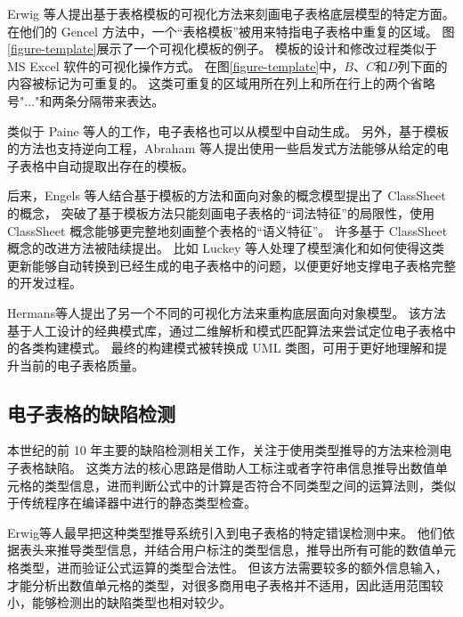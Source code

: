 
Erwig 等人\cite{erwig2004gencel,erwig2005automatic,abraham2005goal}提出基于表格模板的可视化方法来刻画电子表格底层模型的特定方面。
在他们的 Gencel 方法中，一个“表格模板”被用来特指电子表格中重复的区域。
图\ref{figure-template}展示了一个可视化模板的例子。
模板的设计和修改过程类似于 MS Excel 软件的可视化操作方式。
在图\ref{figure-template}中，$B$、$C$和$D$列下面的内容被标记为可重复的。
这类可重复的区域用所在列上和所在行上的两个省略号"..."和两条分隔带来表达。

类似于 Paine 等人的工作，电子表格也可以从模型中自动生成。
另外，基于模板的方法也支持逆向工程，Abraham 等人\cite{abraham2006inferring}提出使用一些启发式方法能够从给定的电子表格中自动提取出存在的模板。

后来，Engels 等人\cite{engels2005classsheets,cunha2010automatically}结合基于模板的方法和面向对象的概念模型提出了 ClassSheet 的概念，
突破了基于模板方法只能刻画电子表格的“词法特征”的局限性，使用 ClassSheet 概念能够更完整地刻画整个表格的“语义特征”。
许多基于 ClassSheet 概念的改进方法被陆续提出\cite{luckey2012systematic,cunha2011type,cunha2011embedding,cunha2012bidirectional}。
比如 Luckey 等人\cite{luckey2012systematic}处理了模型演化和如何使得这类更新能够自动转换到已经生成的电子表格中的问题，以便更好地支撑电子表格完整的开发过程。

Hermans等人\cite{hermans2010automatically}提出了另一个不同的可视化方法来重构底层面向对象模型。
该方法基于人工设计的经典模式库，通过二维解析和模式匹配算法来尝试定位电子表格中的各类构建模式。
最终的构建模式被转换成 UML 类图，可用于更好地理解和提升当前的电子表格质量。

\subsection{电子表格的缺陷检测}
本世纪的前 10 年主要的缺陷检测相关工作，关注于使用类型推导的方法\cite{erwig2002adding,burnett2002testing,ahmad2003type,abraham2004header,abraham2006type,abraham2007ucheck,antoniu2004validating,chambers2009automatic,chambers2010reasoning}来检测电子表格缺陷。
这类方法的核心思路是借助人工标注或者字符串信息推导出数值单元格的类型信息，进而判断公式中的计算是否符合不同类型之间的运算法则，类似于传统程序在编译器中进行的静态类型检查。

Erwig等人\cite{erwig2002adding,abraham2004header}最早把这种类型推导系统引入到电子表格的特定错误检测中来。
他们依据表头来推导类型信息，并结合用户标注的类型信息，推导出所有可能的数值单元格类型，进而验证公式运算的类型合法性。
但该方法需要较多的额外信息输入，才能分析出数值单元格的类型，对很多商用电子表格并不适用，因此适用范围较小，能够检测出的缺陷类型也相对较少。

